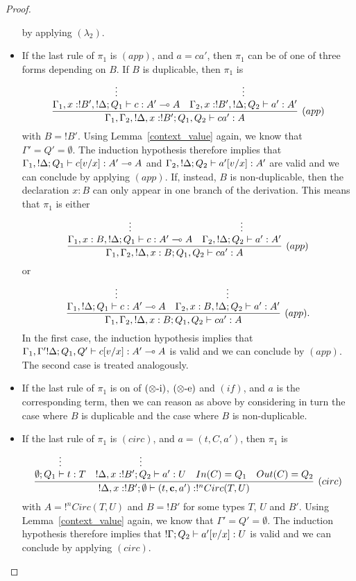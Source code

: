 \documentclass{article}
\begin{document}
\begin{proof}
\begin{itemize}
 by applying $(\lambda_2)$.
 \item If the last rule of $\pi_1$ is $(app)$, and $a=ca'$, then $\pi_1$ can 
 be of one of three forms depending on $B$. If $B$ is duplicable, then $\pi_1$ is
 \[
 \infer[(app)]{\Gamma_1,\Gamma_2,!\Delta,x:!B';Q_1,Q_2\entails ca':A}{
    \deduce[]{\Gamma_1, x:!B',!\Delta;Q_1\entails c:A'\loli A}{
      \vdots
    }
    &
    \deduce[]{\Gamma_2, x:!B',!\Delta ;Q_2\entails a':A' }{
      \vdots
    }
 }
 \]
 with $B=!B'$. Using 
 Lemma~\hyperref[context_value]{\ref*{context_value}} again, we 
 know that $\Gamma'=Q'=\emptyset$. The induction hypothesis therefore 
 implies that $\Gamma_1,!\Delta;Q_1\vdash c[v/x]:A'\multimap A$ and 
 $\Gamma_2,!\Delta ;Q_2\vdash a'[v/x]:A'$ are valid and we can conclude 
 by applying $(app)$. If, instead, $B$ is non-duplicable, then the declaration 
 $x:B$ can only appear in one branch of the derivation. This means that $\pi_1$ 
 is either 
  \[
 \infer[(app)]{\Gamma_1,\Gamma_2,!\Delta,x:B;Q_1,Q_2\entails ca':A}{
    \deduce[]{\Gamma_1, x:B,!\Delta;Q_1\entails c:A'\loli A}{
      \vdots
    }
    &
    \deduce[]{\Gamma_2, !\Delta ;Q_2\entails a':A'}{
      \vdots
    }     
 }
 \]
 or
  \[
 \infer[(app).]{\Gamma_1,\Gamma_2,!\Delta,x:B;Q_1,Q_2\entails ca':A}{
    \deduce[]{\Gamma_1, !\Delta;Q_1\entails c:A'\loli A}{ 
      \vdots
    }
    &
    \deduce[]{\Gamma_2, x:B,!\Delta ;Q_2\entails a':A'}{
      \vdots
    }     
 }
 \]
 In the first case, the induction hypothesis implies that 
 $\Gamma_1,\Gamma' !\Delta;Q_1,Q'\vdash c[v/x]:A'\multimap A$ is valid and 
 we can conclude by $(app)$. The second case is treated analogously.
 \item If the last rule of $\pi_1$ is on of $(\otimes\mbox{-i})$, $(\otimes\mbox{-e})$ 
 and $(if)$, and $a$ is the corresponding term, then we can reason as above
 by considering in turn the case where $B$ is duplicable and the case where
 $B$ is non-duplicable.
 \item If the last rule of $\pi_1$ is $(circ)$, and $a=(t,C,a')$, then 
 $\pi_1$ is
 \[
 \infer[(circ)]{!\Delta,x:!B';\emptyset \entails (t,\mathbf{c},a'):!^nCirc(T,U)}{
    \deduce[]{\emptyset ; Q_1\entails t:T}{
      \vdots
    }    
    &
    \deduce[]{!\Delta,x:!B' ; Q_2\entails a':U}{
      \vdots
    }     
    &
    In(C)=Q_1 
    &
    Out(C)=Q_2
 }
 \]
 with $A=!^nCirc(T,U)$ and $B=!B'$ for some types $T$, $U$ and $B'$. Using  
 Lemma~\hyperref[context_value]{\ref*{context_value}} again, we know 
 that $\Gamma'=Q'=\emptyset$. The induction hypothesis therefore implies that
 $!\Gamma; Q_2\vdash a'[v/x]:U$ is valid and we can conclude
 by applying $(circ)$.
\end{itemize}
\end{proof}
\end{document}

